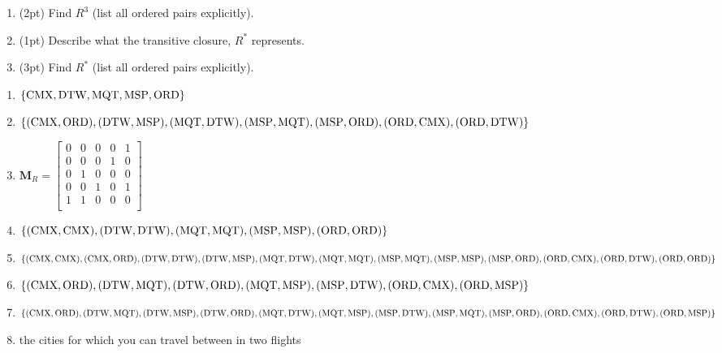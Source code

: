 \begin{questions}
\begin{enumerate}[label=(\alph*),itemsep=0pt,parsep=0pt,topsep=0pt,partopsep=0pt]
	\item (2pt) Find $R^3$ (list all ordered pairs explicitly).
	\item (1pt) Describe what the transitive closure, $R^{*}$ represents.
	\item (3pt) Find $R^{*}$ (list all ordered pairs explicitly).
\end{enumerate}
    \ifprintanswers
        \vspace{-10pt}
    \fi
    \begin{solution}
    \begin{enumerate}[label=(\alph*),itemsep=2pt,parsep=0pt,topsep=0pt,partopsep=0pt]
        \item $\{ \text{CMX}, \text{DTW}, \text{MQT}, \text{MSP}, \text{ORD} \}$
        \item $\{  (\text{CMX}, \text{ORD}), (\text{DTW}, \text{MSP}), (\text{MQT}, \text{DTW}), (\text{MSP}, \text{MQT}), (\text{MSP}, \text{ORD}), \\
        (\text{ORD}, \text{CMX}), (\text{ORD}, \text{DTW})\}$
        \item $ \mathbf{M}_R = 
            \begin{bmatrix} 
                0 & 0 & 0 & 0 & 1 \\
                0 & 0 & 0 & 1 & 0 \\
                0 & 1 & 0 & 0 & 0 \\
                0 & 0 & 1 & 0 & 1 \\
                1 & 1 & 0 & 0 & 0 \\
            \end{bmatrix} $
        \item $\{  (\text{CMX}, \text{CMX}), (\text{DTW}, \text{DTW}), (\text{MQT}, \text{MQT}), (\text{MSP}, \text{MSP}), (\text{ORD}, \text{ORD})\}$
        \item $\{  (\text{CMX}, \text{CMX}), (\text{CMX}, \text{ORD}), (\text{DTW}, \text{DTW}), (\text{DTW}, \text{MSP}), (\text{MQT}, \text{DTW}), \\
         (\text{MQT}, \text{MQT}), (\text{MSP}, \text{MQT}), (\text{MSP}, \text{MSP}), (\text{MSP}, \text{ORD}), (\text{ORD}, \text{CMX}), \\
         (\text{ORD}, \text{DTW}), (\text{ORD}, \text{ORD}) \}$
        \item $\{  (\text{CMX}, \text{ORD}), (\text{DTW}, \text{MQT}), (\text{DTW}, \text{ORD}), (\text{MQT}, \text{MSP}), (\text{MSP}, \text{DTW}), \\
        (\text{ORD}, \text{CMX}), (\text{ORD}, \text{MSP})\}$
        \item $\{  (\text{CMX}, \text{ORD}), (\text{DTW}, \text{MQT}), (\text{DTW}, \text{MSP}), (\text{DTW}, \text{ORD}), (\text{MQT}, \text{DTW}), \\
        (\text{MQT}, \text{MSP}), (\text{MSP}, \text{DTW}), (\text{MSP}, \text{MQT}), (\text{MSP}, \text{ORD}), (\text{ORD}, \text{CMX}), \\
         (\text{ORD}, \text{DTW}), (\text{ORD}, \text{MSP})\}$
        \item the cities for which you can travel between in two flights

\end{enumerate}
\end{solution}
\end{questions}
